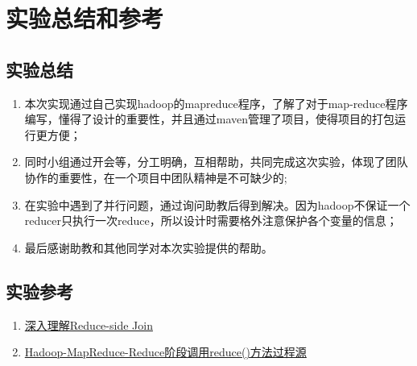 \documentclass{article}
\begin{document}
\section{实验总结和参考}

\subsection{实验总结}

\begin{enumerate}[1)]
	\item 本次实现通过自己实现hadoop的mapreduce程序，了解了对于map-reduce程序编写，懂得了设计的重要性，并且通过maven管理了项目，使得项目的打包运行更方便；
	\item 同时小组通过开会等，分工明确，互相帮助，共同完成这次实验，体现了团队协作的重要性，在一个项目中团队精神是不可缺少的;
	\item 在实验中遇到了并行问题，通过询问助教后得到解决。因为hadoop不保证一个reducer只执行一次reduce，所以设计时需要格外注意保护各个变量的信息；
	\item 最后感谢助教和其他同学对本次实验提供的帮助。
\end{enumerate}

\subsection{实验参考}

\begin{enumerate}[1)]
	\item  \href{http://shzhangji.com/cnblogs/2015/01/13/understand-reduce-side-join/}{深入理解Reduce-side Join}
	\item \href{https://blog.csdn.net/H_X_P_/article/details/106071511}{Hadoop-MapReduce-Reduce阶段调用reduce()方法过程源
	}
\end{enumerate}
\end{document}
